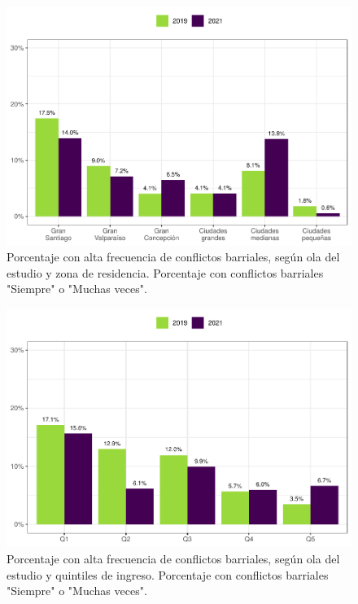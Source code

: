 \documentclass[
  12pt,
  openany]{book}
\begin{document}
\begin{figure}

{\centering \includegraphics{reporte-elsoc_files/figure-latex/confli-estrato-1} 

}

\caption{Porcentaje con alta frecuencia de conflictos barriales, según ola del estudio y zona de residencia. Porcentaje con conflictos barriales "Siempre" o "Muchas veces".}\label{fig:confli-estrato}
\end{figure}

\begin{figure}

{\centering \includegraphics{reporte-elsoc_files/figure-latex/confli-quintil-1} 

}

\caption{Porcentaje con alta frecuencia de conflictos barriales, según ola del estudio y quintiles de ingreso. Porcentaje con conflictos barriales "Siempre" o "Muchas veces".}\label{fig:confli-quintil}
\end{figure}
\end{document}
